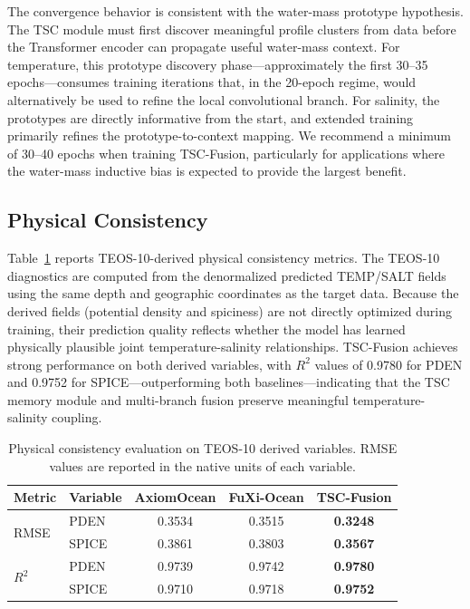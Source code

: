 \documentclass[conference]{IEEEtran}
\begin{document}
The convergence behavior is consistent with the water-mass prototype hypothesis. The TSC module must first discover meaningful profile clusters from data before the Transformer encoder can propagate useful water-mass context. For temperature, this prototype discovery phase---approximately the first 30--35 epochs---consumes training iterations that, in the 20-epoch regime, would alternatively be used to refine the local convolutional branch. For salinity, the prototypes are directly informative from the start, and extended training primarily refines the prototype-to-context mapping. We recommend a minimum of 30--40 epochs when training TSC-Fusion, particularly for applications where the water-mass inductive bias is expected to provide the largest benefit.

\subsection{Physical Consistency}

Table~\ref{tab:physical} reports TEOS-10-derived physical consistency metrics. The TEOS-10 diagnostics are computed from the denormalized predicted TEMP/SALT fields using the same depth and geographic coordinates as the target data. Because the derived fields (potential density and spiciness) are not directly optimized during training, their prediction quality reflects whether the model has learned physically plausible joint temperature-salinity relationships. TSC-Fusion achieves strong performance on both derived variables, with $R^2$ values of 0.9780 for PDEN and 0.9752 for SPICE---outperforming both baselines---indicating that the TSC memory module and multi-branch fusion preserve meaningful temperature-salinity coupling.

\begin{table}[t]
\centering
\caption{Physical consistency evaluation on TEOS-10 derived variables. RMSE values are reported in the native units of each variable.}
\label{tab:physical}
\footnotesize
\renewcommand{\arraystretch}{1.08}
\begin{tabular}{@{}llccc@{}}
\toprule
\textbf{Metric} & \textbf{Variable} & \textbf{AxiomOcean} & \textbf{FuXi-Ocean} & \textbf{TSC-Fusion} \\
\midrule
\multirow{2}{*}{RMSE}
& PDEN  & 0.3534 & 0.3515 & \textbf{0.3248} \\
& SPICE & 0.3861 & 0.3803 & \textbf{0.3567} \\
\midrule
\multirow{2}{*}{$R^2$}
& PDEN  & 0.9739 & 0.9742 & \textbf{0.9780} \\
& SPICE & 0.9710 & 0.9718 & \textbf{0.9752} \\
\bottomrule
\end{tabular}
\end{table}
\end{document}

